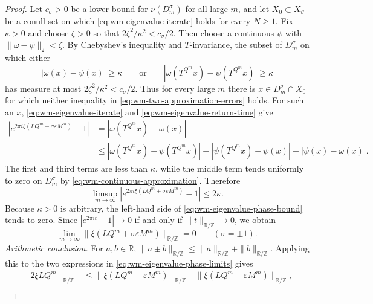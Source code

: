 \documentclass[11pt,reqno,a4paper]{amsart}
\numberwithin{equation}{section}
\theoremstyle{compact}
\theoremstyle{definition}
\theoremstyle{definition}
\begin{document}
\begin{proof}
Let $c_\sigma>0$ be a lower bound for $\nu(D_m^\sigma)$ for all large
$m$, and let $X_0\subset X_\vartheta$ be a conull set on which
\eqref{eq:wm-eigenvalue-iterate} holds for every $N\geq1$.  Fix
$\kappa>0$ and choose $\zeta>0$ so that
$2\zeta^2/\kappa^2<c_\sigma/2$.  Then choose a continuous
$\psi$ with $\|\omega-\psi\|_2<\zeta$.  By Chebyshev's inequality and
$T$-invariance, the subset of $D_m^\sigma$ on which either
\begin{equation}\label{eq:wm-two-approximation-errors}
  |\omega(x)-\psi(x)|\geq\kappa
  \qquad\text{or}\qquad
  |\omega(T^{Q^m}x)-\psi(T^{Q^m}x)|\geq\kappa
\end{equation}
has measure at most $2\zeta^2/\kappa^2<c_\sigma/2$.  Thus for every large
$m$ there is $x\in D_m^\sigma\cap X_0$ for which neither inequality in
\eqref{eq:wm-two-approximation-errors} holds.  For such an $x$, \eqref{eq:wm-eigenvalue-iterate} and
\eqref{eq:wm-eigenvalue-return-time} give
\begin{align*}
  \left|e^{2\pi i\xi(LQ^m+\sigma\varepsilon M^m)}-1\right|
  &=|\omega(T^{Q^m}x)-\omega(x)| \\
  &\leq |\omega(T^{Q^m}x)-\psi(T^{Q^m}x)|
       +|\psi(T^{Q^m}x)-\psi(x)|
       +|\psi(x)-\omega(x)|.
\end{align*}
The first and third terms are less than $\kappa$, while the middle term
tends uniformly to zero on $D_m^\sigma$ by
\eqref{eq:wm-continuous-approximation}.  Therefore
\begin{equation}\label{eq:wm-eigenvalue-phase-bound}
  \limsup_{m\to\infty}
  \left|e^{2\pi i\xi(LQ^m+\sigma\varepsilon M^m)}-1\right|
  \leq2\kappa.
\end{equation}
Because $\kappa>0$ is arbitrary, the left-hand side of
\eqref{eq:wm-eigenvalue-phase-bound} tends to zero.  Since
$|e^{2\pi it}-1|\to0$ if and only if
$\|t\|_{\mathbb R/\mathbb Z}\to0$, we obtain
\begin{equation}\label{eq:wm-eigenvalue-phase-limits}
  \lim_{m\to\infty}
  \|\xi(LQ^m+\sigma\varepsilon M^m)\|_{\mathbb R/\mathbb Z}=0
  \qquad(\sigma=\pm1).
\end{equation}
\smallskip\noindent\emph{Arithmetic conclusion.}
For $a,b\in\mathbb R$,
$\|a\pm b\|_{\mathbb R/\mathbb Z}
 \leq\|a\|_{\mathbb R/\mathbb Z}+\|b\|_{\mathbb R/\mathbb Z}$.
Applying this to the two expressions in
\eqref{eq:wm-eigenvalue-phase-limits} gives
\begin{align*}
  \|2\xi LQ^m\|_{\mathbb R/\mathbb Z}
  &\leq
  \|\xi(LQ^m+\varepsilon M^m)\|_{\mathbb R/\mathbb Z}
  +\|\xi(LQ^m-\varepsilon M^m)\|_{\mathbb R/\mathbb Z},\\

\end{align*}
\end{proof}
\end{document}
